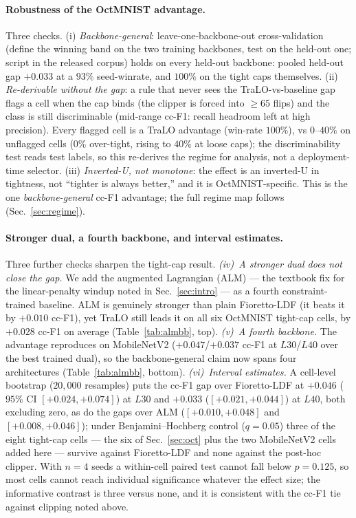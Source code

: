 \documentclass[10pt]{article}
\begin{document}
\paragraph{Robustness of the OctMNIST advantage.}
Three checks. (i) \emph{Backbone-general}: leave-one-backbone-out
cross-validation (define the winning band on the two training backbones,
test on the held-out one; script in the released corpus) holds on every
held-out backbone: pooled held-out gap $+0.033$ at a $93\%$ seed-winrate,
and $100\%$ on the tight caps themselves. (ii) \emph{Re-derivable without
the gap}: a rule that never sees the TraLO-vs-baseline gap flags a cell
when the cap binds (the clipper is forced into $\ge 65$ flips) and the
class is still discriminable (mid-range cc-F1: recall headroom left at
high precision). Every flagged cell is a TraLO advantage
(win-rate $100\%$), vs $0$--$40\%$ on unflagged cells ($0\%$ over-tight,
rising to $40\%$ at loose caps); the discriminability test reads test
labels, so this re-derives the regime for analysis, not a deployment-time
selector. (iii) \emph{Inverted-U, not monotone}: the effect is an
inverted-U in tightness, not ``tighter is always better,'' and it is
OctMNIST-specific. This is the one \emph{backbone-general} cc-F1
advantage; the full regime map follows (Sec.~\ref{sec:regime}).

{\color{blue}
\paragraph{Stronger dual, a fourth backbone, and interval estimates.}
Three further checks sharpen the tight-cap result. \emph{(iv)~A stronger dual does not
close the gap.} We add the augmented Lagrangian (ALM)
\citep{bertsekas1982constrained} --- the textbook fix for the
linear-penalty windup noted in Sec.~\ref{sec:intro} --- as a fourth
constraint-trained baseline. ALM is genuinely stronger than plain Fioretto-LDF (it
beats it by $+0.010$ cc-F1), yet TraLO still leads it on all six OctMNIST tight-cap
cells, by $+0.028$ cc-F1 on average (Table~\ref{tab:almbb}, top). \emph{(v)~A fourth
backbone.} The advantage reproduces on MobileNetV2 ($+0.047$/$+0.037$ cc-F1 at
$L30$/$L40$ over the best trained dual), so the backbone-general claim now spans four
architectures (Table~\ref{tab:almbb}, bottom). \emph{(vi)~Interval estimates.} A
cell-level bootstrap ($20{,}000$ resamples) puts the cc-F1 gap over Fioretto-LDF at
$+0.046$ ($95\%$ CI $[{+}0.024,{+}0.074]$) at $L30$ and $+0.033$
($[{+}0.021,{+}0.044]$) at $L40$, both excluding zero, as do the gaps over ALM
($[{+}0.010,{+}0.048]$ and $[{+}0.008,{+}0.046]$); under Benjamini--Hochberg control
($q{=}0.05$) three of the eight tight-cap cells --- the six of Sec.~\ref{sec:oct} plus the
two MobileNetV2 cells added here --- survive against Fioretto-LDF and none
against the post-hoc clipper. With $n{=}4$ seeds a within-cell paired test cannot fall
below $p{=}0.125$, so most cells cannot reach individual significance whatever the effect
size; the informative contrast is three versus none, and it is consistent with the cc-F1
tie against clipping noted above.}
\end{document}
